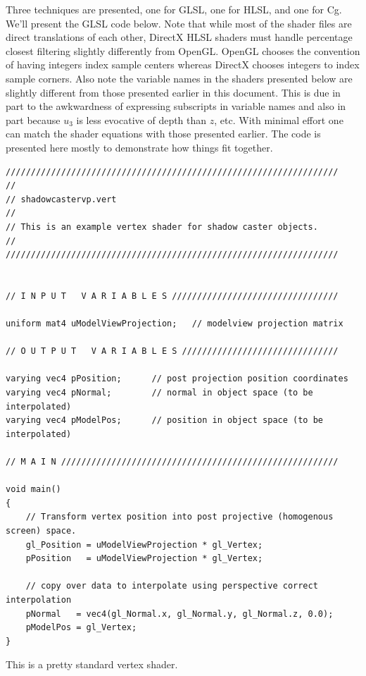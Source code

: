 \documentclass[]{article}  %
\begin{document}
Three techniques are presented, one for GLSL, one for HLSL, and one for Cg.  We'll present the GLSL code below.  Note that while most of the shader files are direct translations of each other, DirectX HLSL shaders must handle percentage closest filtering slightly differently from OpenGL.  OpenGL chooses the convention of having integers index sample centers whereas DirectX chooses integers to index sample corners.  Also note the variable names in the shaders presented below are slightly different from those presented earlier in this document.  This is due in part to the awkwardness of expressing subscripts in variable names and also in part because $u_3$ is less evocative of depth than $z$, etc.  With minimal effort one can match the shader equations with those presented earlier.  The code is presented here mostly to demonstrate how things fit together.  

\begin{verbatim}
//////////////////////////////////////////////////////////////////
//
// shadowcastervp.vert
//
// This is an example vertex shader for shadow caster objects.  
//
//////////////////////////////////////////////////////////////////


// I N P U T   V A R I A B L E S /////////////////////////////////

uniform mat4 uModelViewProjection;   // modelview projection matrix

// O U T P U T   V A R I A B L E S ///////////////////////////////

varying vec4 pPosition;      // post projection position coordinates
varying vec4 pNormal;        // normal in object space (to be interpolated)
varying vec4 pModelPos;      // position in object space (to be interpolated) 

// M A I N ///////////////////////////////////////////////////////

void main()
{
    // Transform vertex position into post projective (homogenous screen) space.
    gl_Position = uModelViewProjection * gl_Vertex;
    pPosition   = uModelViewProjection * gl_Vertex;
   
    // copy over data to interpolate using perspective correct interpolation
    pNormal   = vec4(gl_Normal.x, gl_Normal.y, gl_Normal.z, 0.0);
    pModelPos = gl_Vertex;
}
\end{verbatim}
This is a pretty standard vertex shader.
\end{document}
